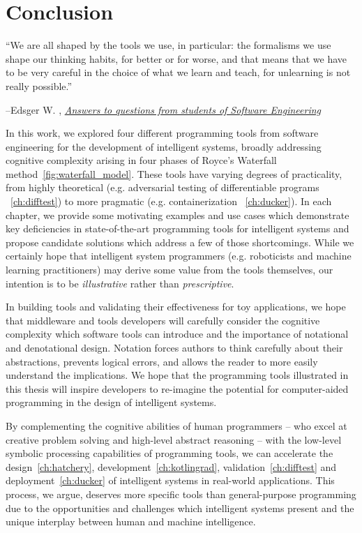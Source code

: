 \chapter{Conclusion}\label{ch:conclusion}
\setlength{\epigraphwidth}{0.90\textwidth}
\epigraph{``We are all shaped by the tools we use, in particular: the formalisms we use shape our thinking habits, for better or for worse, and that means that we have to be very careful in the choice of what we learn and teach, for unlearning is not really possible.''}{\begin{flushright}--Edsger W. \citet{dijkstra2000answers}, \href{https://www.cs.utexas.edu/~EWD/transcriptions/EWD13xx/EWD1305.html}{\textit{Answers to questions from students of Software Engineering}}\end{flushright}}

In this work, we explored four different programming tools from software engineering for the development of intelligent systems, broadly addressing cognitive complexity arising in four phases of Royce's Waterfall method~\autoref{fig:waterfall_model}. These tools have varying degrees of practicality, from highly theoretical (e.g. adversarial testing of differentiable programs ~\autoref{ch:difftest}) to more pragmatic (e.g. containerization ~\autoref{ch:ducker}). In each chapter, we provide some motivating examples and use cases which demonstrate key deficiencies in state-of-the-art programming tools for intelligent systems and propose candidate solutions which address a few of those shortcomings. While we certainly hope that intelligent system programmers (e.g. roboticists and machine learning practitioners) may derive some value from the tools themselves, our intention is to be \textit{illustrative} rather than \textit{prescriptive}.

In building tools and validating their effectiveness for toy applications, we hope that middleware and tools developers will carefully consider the cognitive complexity which software tools can introduce and the importance of notational and denotational design. Notation forces authors to think carefully about their abstractions, prevents logical errors, and allows the reader to more easily understand the implications. We hope that the programming tools illustrated in this thesis will inspire developers to re-imagine the potential for computer-aided programming in the design of intelligent systems.

By complementing the cognitive abilities of human programmers -- who excel at creative problem solving and high-level abstract reasoning -- with the low-level symbolic processing capabilities of programming tools, we can accelerate the design~\autoref{ch:hatchery}, development~\autoref{ch:kotlingrad}, validation~\autoref{ch:difftest} and deployment~\autoref{ch:ducker} of intelligent systems in real-world applications. This process, we argue, deserves more specific tools than general-purpose programming due to the opportunities and challenges which intelligent systems present and the unique interplay between human and machine intelligence.

